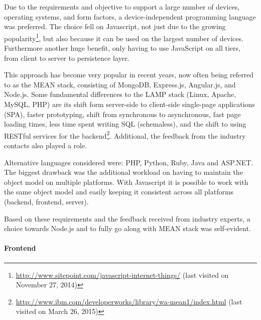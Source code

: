 		Due to the requirements and objective to support a large number of devices, operating systems, and form factors, a device-independent programming language was preferred. 
		The choice fell on Javascript, not just due to the growing popularity\footnote{\url{http://www.sitepoint.com/javascript-internet-things/} (last visited on November 27, 2014)}, but also because it can be used on the largest number of devices. Furthermore another huge benefit, only having to use JavaScript on all tiers, from client to server to persistence layer.

		This approach has become very popular in recent years, now often being referred to as the MEAN stack, consisting of MongoDB, Express.js, Angular.js, and Node.js. Some fundamental differences to the LAMP stack (Linux, Apache, MySQL, PHP) are its shift form server-side to client-side single-page applications (SPA), faster prototyping, shift from synchronous to asynchronous, fast page loading times, less time spent writing SQL (schemaless), and the shift to using RESTful services for the backend\footnote{\url{http://www.ibm.com/developerworks/library/wa-mean1/index.html} (last visited on March 26, 2015)}. Additional, the feedback from the industry contacts also played a role. 

		Alternative languages considered were: PHP, Python, Ruby, Java and ASP.NET. The biggest drawback was the additional workload on having to maintain the object model on multiple platforms. With Javascript it is possible to work with the same object model and easily keeping it consistent across all platforms (backend, frontend, server).


				Based on these requirements and the feedback received from industry experts, a choice towards Node.js and to fully go along with MEAN stack was self-evident.



	\paragraph{Frontend}

